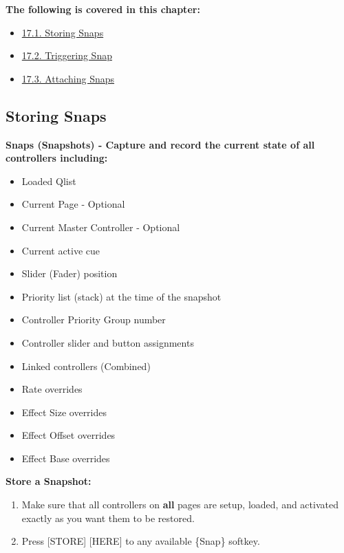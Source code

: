 \documentclass[
]{article}
\providecommand{\tightlist}{%
  \setlength{\itemsep}{0pt}\setlength{\parskip}{0pt}}
\begin{document}
\textbf{The following is covered in this chapter:}

\begin{itemize}
\tightlist
\item
  \href{https://vibemanual.compulite.com/snaps-snapshots.html\#storing-snaps}{17.1. Storing Snaps}
\item
  \href{https://vibemanual.compulite.com/snaps-snapshots.html\#triggering-snap}{17.2. Triggering Snap}
\item
  \href{https://vibemanual.compulite.com/snaps-snapshots.html\#attaching-snaps}{17.3. Attaching Snaps}
\end{itemize}

\hypertarget{storing-snaps}{%
\subsection{Storing Snaps}\label{storing-snaps}}

\textbf{Snaps (Snapshots) - Capture and record the current state of all controllers including:}

\begin{itemize}
\item
  Loaded Qlist
\item
  Current Page - Optional
\item
  Current Master Controller - Optional
\item
  Current active cue
\item
  Slider (Fader) position
\item
  Priority list (stack) at the time of the snapshot
\item
  Controller Priority Group number
\item
  Controller slider and button assignments
\item
  Linked controllers (Combined)
\item
  Rate overrides
\item
  Effect Size overrides
\item
  Effect Offset overrides
\item
  Effect Base overrides
\end{itemize}

\textbf{Store a Snapshot:}

\begin{enumerate}
\def\labelenumi{\arabic{enumi}.}
\item
  Make sure that all controllers on \textbf{all} pages are setup, loaded, and activated exactly as you want them to be restored.
\item
  Press {[}STORE{]} {[}HERE{]} to any available \{Snap\} softkey.
\end{enumerate}
\end{document}
